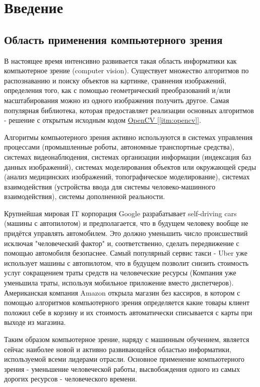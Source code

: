 \chapter{Введение}

\section{Область применения компьютерного зрения}

В настоящее время интенсивно развивается такая область информатики как компьютерное зрение (computer vision). Существует множество алгоритмов по распознаванию и поиску объектов на картинке, сравнения изображений, определения того, как с помощью геометрический преобразований и/или масштабирования можно из одного изображения получить другое. Самая популярная библиотека, которая предоставляет реализации основных алгоритмов - решение с открытым исходным кодом \hyperref[itm:opencv]{OpenCV [\ref{itm:opencv}]}.

Алгоритмы компьютерного зрения активно используются в системах управления процессами (промышленные роботы, автономные транспортные средства), системах видеонаблюдения, системах организации информации (индексация баз данных изображений), системах моделирования объектов или окружающей среды (анализ медицинских изображений, топографическое моделирование), системах взаимодействия (устройства ввода для системы человеко-машинного взаимодействия), системы дополненной реальности.

Крупнейшая мировая IT корпорация Google разрабатывает self-driving cars (машины с автопилотом) и предполагается, что в будущем человеку вообще не придётся управлять автомобилем. Это должно уменьшить число происшествий исключая "человеческий фактор" и, соответственно, сделать передвижение с помощью автомобиля безопаснее. Самый популярный сервис такси - Uber уже использует машины с автопилотом, что в будущем позволит снизить стоимость услуг сокращением траты средств на человеческие ресурсы (Компания уже уменьшила траты, используя мобильное приложение вместо диспетчеров). Американская компания Amazon открыла магазин без кассиров, в котором с помощью алгоритмов компьютерного зрения определяется какие товары клиент положил себе в корзину и их стоимость автоматически списывается с карты при выходе из магазина.

Таким образом компьютерное зрение, наряду с машинным обучением, является сейчас наиболее новой и активно развивающейся областью информатики, используемой всеми лидерами отрасли. Основное применение компьютерного зрения - уменьшение человеческой работы, высвобождения одного из самых дорогих ресурсов - человеческого времени.

